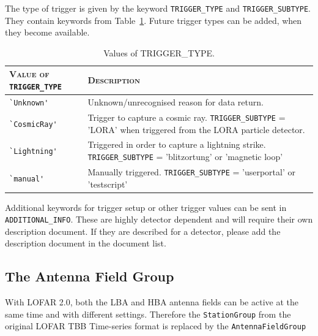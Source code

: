 \documentclass[a4paper,10pt,bibtotoc]{scrartcl}
\begin{document}
The type of trigger is given by the keyword \verb|TRIGGER_TYPE| and \verb|TRIGGER_SUBTYPE|. They contain keywords from Table~\ref{tab:trigger_types}. Future trigger types can be added, when they become available.

\begin{table}[htb]
  \centering
  \begin{tabular}{|lp{9cm}|}
    \hline
    \textsc{Value of} \verb|TRIGGER_TYPE| & \textsc{Description} \\
    \hline
    \hline
    \verb|`Unknown'| & Unknown/unrecognised reason for data return. \\
    \verb|`CosmicRay'| & Trigger to capture a cosmic ray. \verb|TRIGGER_SUBTYPE|  = 'LORA' when triggered from the LORA particle detector.\\
    \verb|`Lightning'| & Triggered in order to capture a lightning strike. \verb|TRIGGER_SUBTYPE| = 'blitzortung' or 'magnetic loop' \\
    \verb|`manual'| & Manually triggered. \verb|TRIGGER_SUBTYPE| = 'userportal' or 'testscript'\\
   \hline
  \end{tabular}
  \caption{Values of TRIGGER\_TYPE.}
  \label{tab:trigger_types}
\end{table}

Additional keywords for trigger setup or other trigger values can be sent in \verb|ADDITIONAL_INFO|. These are highly detector dependent and will require their own description document. If they are described for a detector, please add the description document in the document list.


\subsection{The Antenna Field Group}
\label{sec:antenna field group}

With LOFAR 2.0, both the LBA and HBA antenna fields can be active at the same time and with different settings. Therefore the \texttt{StationGroup} from the original LOFAR TBB Time-series format is replaced by the \texttt{AntennaFieldGroup} 
\end{document}
